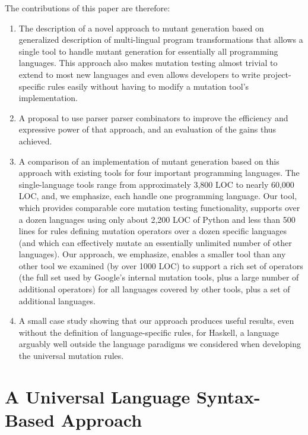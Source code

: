 \documentclass[acmsmall,screen,review,anonymous]{acmart}
\begin{document}
The contributions of this paper are therefore:

\begin{enumerate}
  \item The description of a novel approach to mutant generation
    based on generalized description of multi-lingual program transformations
    that allows a single tool to handle mutant generation for
    essentially all programming languages.  This approach also makes
    mutation testing almost trivial to extend to most new languages and even allows
    developers to write project-specific rules easily without
    having to modify a mutation tool's implementation.

          \item A proposal to use parser parser combinators to improve the
      efficiency and expressive power of that approach, and an
      evaluation of the gains thus achieved.

    
      \item A comparison of an implementation of mutant generation
       based on this approach with existing tools for four important
       programming languages.  The single-language tools range from
       approximately 3,800 LOC to nearly 60,000 LOC, and, we emphasize, each handle
       one programming language.  Our tool, which provides comparable
       core mutation testing functionality, supports over a dozen
       languages using only about 2,200 LOC of Python and less than 500
       lines for rules defining mutation operators over a dozen
       specific languages (and which can effectively mutate an
       essentially unlimited number of other languages).  Our
       approach, we emphasize, enables a smaller tool than any other tool
       we examined (by over 1000 LOC) to support a rich set of
       operators (the full set used by Google's internal mutation
       tools, plus a large number of additional operators) for all languages covered by other tools, plus a set
       of additional languages.

       \item A small case study showing that our approach produces
         useful results, even without the definition of
         language-specific rules, for Haskell, a language arguably
         well outside the language paradigms we considered when
         developing the universal mutation rules.

\end{enumerate}

\section{A Universal Language Syntax-Based Approach}
\end{document}
